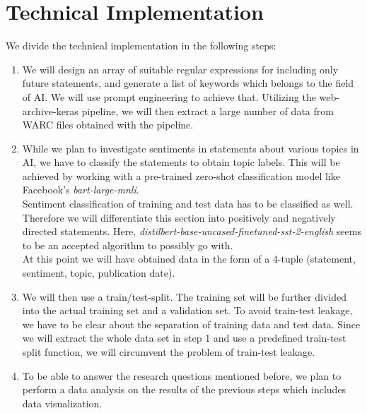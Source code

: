 \documentclass[11pt]{article}
\begin{document}
\section{Technical Implementation}
We divide the technical implementation in the following steps:

\begin{enumerate}
\item%
We will design an array of suitable regular expressions for including only future statements, and generate a list of keywords which belongs to the field of AI.
We will use prompt engineering to achieve that.
Utilizing the web-archive-keras pipeline, we will then extract a large number of data from WARC files obtained with the pipeline.

\item%
While we plan to investigate sentiments in statements about various topics in AI, we have to classify the statements to obtain topic labels.
This will be achieved by working with a pre-trained zero-shot classification model like Facebook’s \textit{bart-large-mnli}.
\\
Sentiment classification of training and test data has to be classified as well.
Therefore we will differentiate this section into positively and negatively directed statements.
Here, \textit{distilbert-base-uncased-finetuned-sst-2-english} seems to be an accepted algorithm to possibly go with.
\\
At this point we will have obtained data in the form of a 4-tuple (statement, sentiment, topic, publication date).

\item%
We will then use a train/test-split.
The training set will be further divided into the actual training set and a validation set.
To avoid train-test leakage, we have to be clear about the separation of training data and test data.
Since we will extract the whole data set in step 1 and use a predefined train-test split function, we will circumvent the problem of train-test leakage.

\item%
To be able to answer the research questions mentioned before, we plan to perform a data analysis on the results of the previous steps which includes data visualization.
\end{enumerate}
\end{document}
